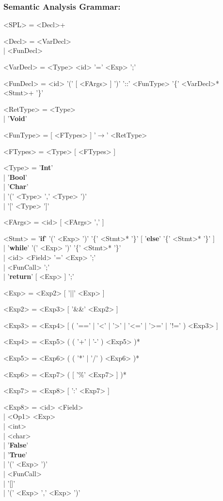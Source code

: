 \documentclass{article}
\begin{document}
\subsubsection*{Semantic Analysis Grammar:}
\begin{grammar}
	<SPL> = <Decl>+

	<Decl> = <VarDecl> \\| <FunDecl>

	<VarDecl> = <Type> <id> '=' <Exp> ';'

	<FunDecl> = <id> '(' [ <FArgs> ] ')' '::' <FunType> '\{' <VarDecl>* <Stmt>+ '\}'

	<RetType> = <Type> \\| '\textbf{Void}'

	<FunType> = [ <FTypes> ] '$\rightarrow$' <RetType>

	<FTypes> = <Type> [ <FTypes> ]

	<Type> = '\textbf{Int}' \\| '\textbf{Bool}' \\| '\textbf{Char}' \\| '(' <Type> ',' <Type> ')' \\| '[' <Type> ']'

	<FArgs> = <id> [ <FArgs> ',' ]

	<Stmt> = '\textbf{if}' '(' <Exp> ')' '\{' <Stmt>* '\}' [ '\textbf{else}' '\{' <Stmt>* '\}' ] \\| '\textbf{while}' '(' <Exp> ')' '\{' <Stmt>* '\}' \\| <id> <Field> '=' <Exp> ';' \\| <FunCall> ';' \\| '\textbf{return}' [ <Exp> ] ';'

	<Exp> = <Exp2> [ '||' <Exp> ]

	<Exp2> = <Exp3> [ '\&\&' <Exp2> ]

	<Exp3> = <Exp4> [ ( '==' | '\textless' | '\textgreater' | '\textless=' | '\textgreater=' | '!=' ) <Exp3> ]

	<Exp4> = <Exp5> ( ( '+' | '-' ) <Exp5> )*

	<Exp5> = <Exp6> ( ( '*' | '/' ) <Exp6> )*

	<Exp6> = <Exp7> ( [ '\%' <Exp7> ] )*

	<Exp7> = <Exp8> [ ':' <Exp7> ]

	<Exp8> = <id> <Field> \\| <Op1> <Exp> \\| <int> \\| <char> \\| '\textbf{False}' \\| '\textbf{True}' \\| '(' <Exp> ')' \\| <FunCall> \\| '[]' \\| '(' <Exp> ',' <Exp> ')'


\end{grammar}
\end{document}
